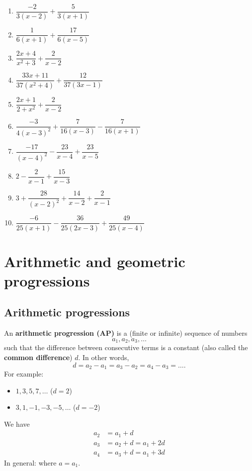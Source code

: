 \documentclass[
  english,
  12pt,
  oneside]{book}
\providecommand{\tightlist}{%
  \setlength{\itemsep}{0pt}\setlength{\parskip}{0pt}}
\theoremstyle{definition}
\theoremstyle{definition}
\theoremstyle{definition}
\theoremstyle{definition}
\theoremstyle{remark}
\begin{document}
\begin{enumerate}
\def\labelenumi{\roman{enumi})}
\tightlist
\item
  \(\dfrac{-2}{3(x-2)}+\dfrac 5{3(x+1)}\)
\item
  \(\dfrac 1{6(x+1)}+\dfrac{17}{6(x-5)}\)
\item
  \(\dfrac{2x+4}{x^2+3}+\dfrac 2{x-2}\)
\item
  \(\dfrac{33x+11}{37(x^2+4)}+\dfrac{12}{37(3x-1)}\)
\item
  \(\dfrac{2x+1}{2+x^2}+\dfrac 2{x-2}\)
\item
  \(\dfrac{-3}{4(x-3)^2}+\dfrac 7{16(x-3)}-\dfrac 7{16(x+1)}\)
\item
  \(\dfrac{-17}{(x-4)^2}-\dfrac{23}{x-4}+\dfrac{23}{x-5}\)
\item
  \(2-\dfrac 2{x-1}+\dfrac{15}{x-3}\)
\item
  \(3+\dfrac{28}{(x-2)^2}+\dfrac{14}{x-2}+\dfrac 2{x-1}\)
\item
  \(\dfrac{-6}{25(x+1)}-\dfrac{36}{25(2x-3)}+\dfrac{49}{25(x-4)}\)
\end{enumerate}

\chapter{Arithmetic and geometric progressions}\label{arithmetic-and-geometric-progressions}

\section{Arithmetic progressions}\label{arithmetic-progressions}

An \textbf{arithmetic progression (AP)} is a (finite or infinite) sequence of numbers
\[a_1,a_2,a_3,\dots\]
such that the difference between consecutive terms is a constant (also called the \textbf{common difference}) \(d\). In other words,
\[d=a_2-a_1=a_3-a_2=a_4-a_3=\dots.\]
For example:

\begin{itemize}
\tightlist
\item
  \(1,3,5,7,\dots\) \quad (\(d=2\))
\item
  \(3,1,-1,-3,-5,\dots\) \quad (\(d=-2\))
\end{itemize}

We have
\begin{align*}
    a_2&=a_1+d\\
    a_3&=a_2+d=a_1+2d \\
    a_4&=a_3+d=a_1+3d
\end{align*}
In general:  where \(a=a_1\).
\end{document}
